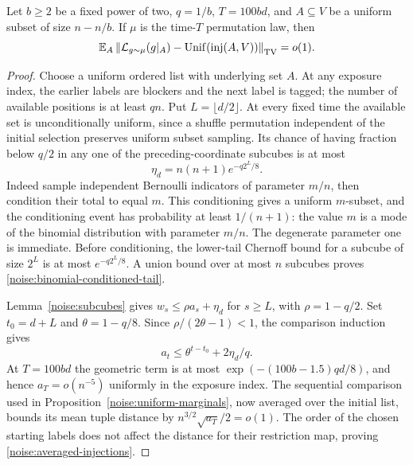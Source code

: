 \begin{proposition}
\label{noise:averaged-general}
Let $b\ge2$ be a fixed power of two, $q=1/b$, $T=100bd$, and
$A\subseteq V$ be a uniform subset of size $n-n/b$. If $\mu$ is the
time-$T$ permutation law, then
\begin{equation}
 \mathbb E_A\left\|\mathcal L_{g\sim\mu}(g|_A)
             -\operatorname{Unif}(\operatorname{inj}(A,V))\right\|_{\mathrm{TV}}=o(1).
 \label{noise:averaged-injections}
\end{equation}
\end{proposition}

\begin{proof}
Choose a uniform ordered list with underlying set $A$. At any exposure
index, the earlier labels are blockers and the next label is tagged;
the number of available positions is at least $qn$. Put $L=\lfloor d/2\rfloor$.
At every fixed time the available set is unconditionally uniform, since a
shuffle permutation independent of the initial selection preserves
uniform subset sampling. Its chance of having fraction below $q/2$
in any one of the preceding-coordinate subcubes is at most
\begin{equation}
 \eta_d=n(n+1)e^{-q2^L/8}.
 \label{noise:binomial-conditioned-tail}
\end{equation}
Indeed sample independent Bernoulli indicators of parameter $m/n$,
then condition their total to equal $m$. This conditioning gives a
uniform $m$-subset, and the conditioning event has probability at
least $1/(n+1)$: the value $m$ is a mode of the binomial distribution
with parameter $m/n$. The degenerate parameter one is immediate.
Before conditioning, the lower-tail Chernoff bound for a subcube
of size $2^L$ is at most $e^{-q2^L/8}$. A union bound over at most
$n$ subcubes proves \eqref{noise:binomial-conditioned-tail}.

Lemma~\ref{noise:subcubes} gives $w_s\le\rho a_s+\eta_d$ for
$s\ge L$, with $\rho=1-q/2$. Set $t_0=d+L$ and $\theta=1-q/8$.
Since $\rho/(2\theta-1)<1$, the comparison induction gives
\[
 a_t\le\theta^{t-t_0}+2\eta_d/q.
\]
At $T=100bd$ the geometric term is at most
$\exp(-(100b-1.5)qd/8)$, and hence $a_T=o(n^{-5})$ uniformly in
the exposure index. The sequential comparison used in
Proposition~\ref{noise:uniform-marginals}, now averaged over the
initial list, bounds its mean tuple distance by
$n^{3/2}\sqrt{a_T}/2=o(1)$. The order of the chosen starting labels
does not affect the distance for their restriction map, proving
\eqref{noise:averaged-injections}.
\end{proof}

